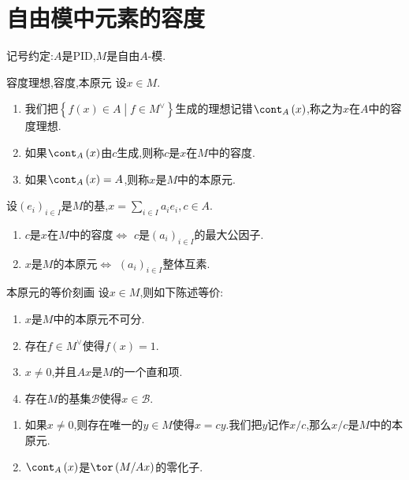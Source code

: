 \section{自由模中元素的容度}

记号约定:$A$是PID,$M$是自由$A$-模.

\begin{definition}{容度理想,容度,本原元}{}
	设$x\in M$.
	\begin{enumerate}
		\item 我们把$\left\{f\left(x\right)\in A\middle|f\in M^{\vee}\right\}$生成的理想记错$\cont_{A}\left(x\right)$,称之为$x$在$A$中的容度理想.
		\item 如果$\cont_{A}\left(x\right)$由$c$生成,则称$c$是$x$在$M$中的容度.
		\item 如果$\cont_{A}\left(x\right)=A$,则称$x$是$M$中的本原元.
	\end{enumerate}
\end{definition}

\begin{remark}{}{}
	设$\left(e_{i}\right)_{i\in I}$是$M$的基,$x=\sum\limits_{i\in I}a_{i}e_{i},c\in A$.
	\begin{enumerate}
		\item $c$是$x$在$M$中的容度$\iff$ $c$是$\left(a_{i}\right)_{i\in I}$的最大公因子.
		\item $x$是$M$的本原元$\iff$ $\left(a_{i}\right)_{i\in I}$整体互素.
	\end{enumerate}
\end{remark}

\begin{lemma}{本原元的等价刻画}{}
	设$x\in M$,则如下陈述等价:
	\begin{enumerate}
		\item $x$是$M$中的本原元不可分.
		\item 存在$f\in M^{\vee}$使得$f\left(x\right)=1$.
		\item $x\neq 0$,并且$Ax$是$M$的一个直和项.
		\item 存在$M$的基集$\mathcal{B}$使得$x\in\mathcal{B}$.
	\end{enumerate}
\end{lemma}

\begin{remark}{}{}
	\begin{enumerate}
		\item 如果$x\neq 0$,则存在唯一的$y\in M$使得$x=cy$.我们把$y$记作$x/c$,那么$x/c$是$M$中的本原元.
		\item $\cont_{A}\left(x\right)$是$\tor\left(M/Ax\right)$的零化子.
	\end{enumerate}
\end{remark}

